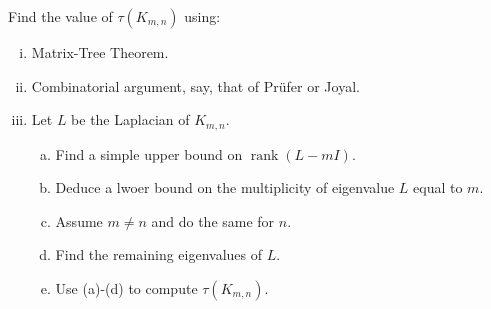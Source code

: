 \documentclass[11pt]{article}
\begin{document}
\begin{quest}
    Find the value of $\tau(K_{m,n})$ using:
    \begin{enumerate}[(i)]
        \item Matrix-Tree Theorem.
        \item Combinatorial argument, say, that of Prüfer or Joyal.
        \item Let $L$ be the Laplacian of $K_{m,n}$.
            \begin{enumerate}[(a)]
                \item Find a simple upper bound on $\mathop{\mathrm{rank}}(L-mI)$.
                \item Deduce a lwoer bound on the multiplicity of eigenvalue $L$ equal to $m$.
                \item Assume $m\neq n$ and do the same for $n$.
                \item Find the remaining eigenvalues of $L$.
                \item Use (a)-(d) to compute $\tau(K_{m,n})$.
            \end{enumerate}
    \end{enumerate}
\end{quest}
\end{document}
